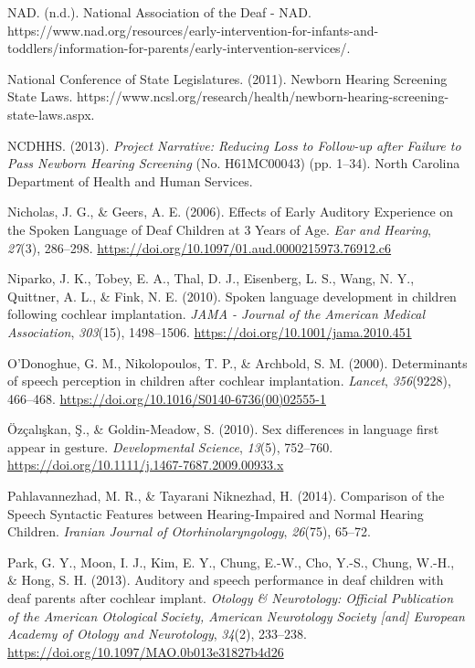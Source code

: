 \documentclass[english,man]{apa6}
\begin{document}
\leavevmode\hypertarget{ref-nad}{}%
NAD. (n.d.). National Association of the Deaf - NAD. https://www.nad.org/resources/early-intervention-for-infants-and-toddlers/information-for-parents/early-intervention-services/.

\leavevmode\hypertarget{ref-nationalconferenceofstatelegislatures2011}{}%
National Conference of State Legislatures. (2011). Newborn Hearing Screening State Laws. https://www.ncsl.org/research/health/newborn-hearing-screening-state-laws.aspx.

\leavevmode\hypertarget{ref-ncdhhs2013}{}%
NCDHHS. (2013). \emph{Project Narrative: Reducing Loss to Follow-up after Failure to Pass Newborn Hearing Screening} (No. H61MC00043) (pp. 1--34). North Carolina Department of Health and Human Services.

\leavevmode\hypertarget{ref-nicholas2006}{}%
Nicholas, J. G., \& Geers, A. E. (2006). Effects of Early Auditory Experience on the Spoken Language of Deaf Children at 3 Years of Age. \emph{Ear and Hearing}, \emph{27}(3), 286--298. \url{https://doi.org/10.1097/01.aud.0000215973.76912.c6}

\leavevmode\hypertarget{ref-niparko2010}{}%
Niparko, J. K., Tobey, E. A., Thal, D. J., Eisenberg, L. S., Wang, N. Y., Quittner, A. L., \& Fink, N. E. (2010). Spoken language development in children following cochlear implantation. \emph{JAMA - Journal of the American Medical Association}, \emph{303}(15), 1498--1506. \url{https://doi.org/10.1001/jama.2010.451}

\leavevmode\hypertarget{ref-odonoghue2000}{}%
O'Donoghue, G. M., Nikolopoulos, T. P., \& Archbold, S. M. (2000). Determinants of speech perception in children after cochlear implantation. \emph{Lancet}, \emph{356}(9228), 466--468. \url{https://doi.org/10.1016/S0140-6736(00)02555-1}

\leavevmode\hypertarget{ref-ozcaliskan2010}{}%
Özçalışkan, Ş., \& Goldin-Meadow, S. (2010). Sex differences in language first appear in gesture. \emph{Developmental Science}, \emph{13}(5), 752--760. \url{https://doi.org/10.1111/j.1467-7687.2009.00933.x}

\leavevmode\hypertarget{ref-pahlavannezhad2014}{}%
Pahlavannezhad, M. R., \& Tayarani Niknezhad, H. (2014). Comparison of the Speech Syntactic Features between Hearing-Impaired and Normal Hearing Children. \emph{Iranian Journal of Otorhinolaryngology}, \emph{26}(75), 65--72.

\leavevmode\hypertarget{ref-park2013}{}%
Park, G. Y., Moon, I. J., Kim, E. Y., Chung, E.-W., Cho, Y.-S., Chung, W.-H., \& Hong, S. H. (2013). Auditory and speech performance in deaf children with deaf parents after cochlear implant. \emph{Otology \& Neurotology: Official Publication of the American Otological Society, American Neurotology Society {[}and{]} European Academy of Otology and Neurotology}, \emph{34}(2), 233--238. \url{https://doi.org/10.1097/MAO.0b013e31827b4d26}
\end{document}
